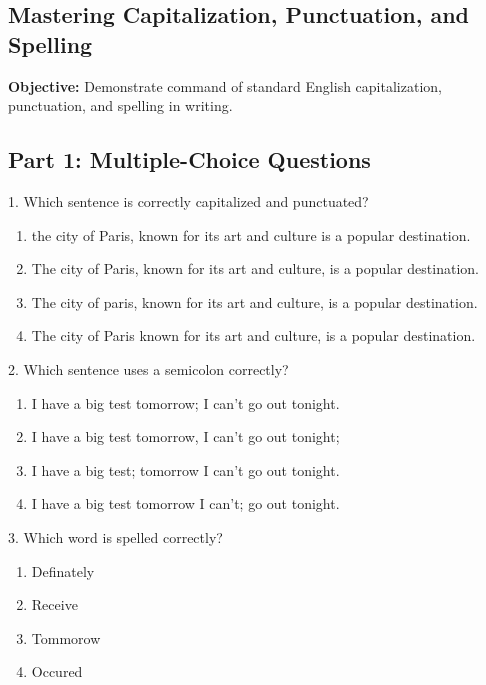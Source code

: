 \documentclass[12pt]{article}
\begin{document}
\subsection*{Mastering Capitalization, Punctuation, and Spelling}
\onehalfspacing

\begin{tcolorbox}[colframe=black!40, colback=gray!0, title=Learning Objective]
\textbf{Objective:} Demonstrate command of standard English capitalization, punctuation, and spelling in writing.
\end{tcolorbox}

\subsection*{Part 1: Multiple-Choice Questions}

1. Which sentence is correctly capitalized and punctuated?  
\begin{enumerate}[label=\Alph*.]
    \item the city of Paris, known for its art and culture is a popular destination.  
    \item The city of Paris, known for its art and culture, is a popular destination.  
    \item The city of paris, known for its art and culture, is a popular destination.  
    \item The city of Paris known for its art and culture, is a popular destination.  
\end{enumerate}

\vspace{1cm}

2. Which sentence uses a semicolon correctly?  
\begin{enumerate}[label=\Alph*.]
    \item I have a big test tomorrow; I can't go out tonight.  
    \item I have a big test tomorrow, I can't go out tonight;  
    \item I have a big test; tomorrow I can't go out tonight.  
    \item I have a big test tomorrow I can't; go out tonight.  
\end{enumerate}

\vspace{1cm}

3. Which word is spelled correctly?  
\begin{enumerate}[label=\Alph*.]
    \item Definately  
    \item Receive  
    \item Tommorow  
    \item Occured  
\end{enumerate}
\end{document}
